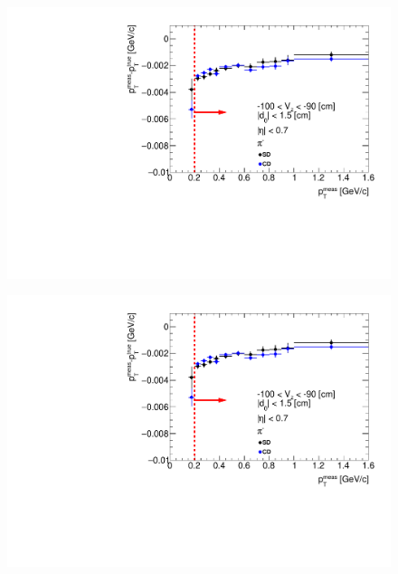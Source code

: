 \begin{figure}[H]
{  \includegraphics[width=\linewidth,page=157]{graphics/energyLoss/energyLoss3D_OnePrtAlso.pdf}\\
}%
\end{figure}

\begin{figure}[H]\ContinuedFloat
\vspace{-3.5em}
\parbox{0.329\textwidth}{
  \includegraphics[width=\linewidth,page=158]{graphics/energyLoss/energyLoss3D_OnePrtAlso.pdf}\\
  \vspace{-4em}
}~
\end{figure}

